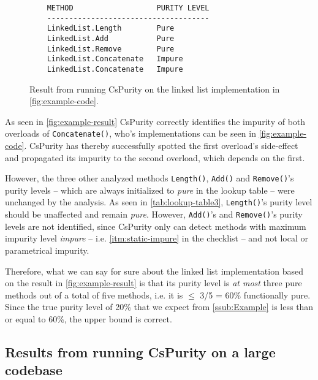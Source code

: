 \documentclass[a4paper,12pt]{article}
\begin{document}
\begin{figure}[htpb]
  \centering
  \begin{minipage}{\linewidth} %
    \begin{lstlisting}
    METHOD                   PURITY LEVEL
    -------------------------------------
    LinkedList.Length        Pure
    LinkedList.Add           Pure
    LinkedList.Remove        Pure
    LinkedList.Concatenate   Impure
    LinkedList.Concatenate   Impure
    \end{lstlisting}
  \end{minipage}
  \caption{Result from running CsPurity on the linked list implementation in \autoref{fig:example-code}.}
  \label{fig:example-result}
\end{figure}

As seen in \autoref{fig:example-result} CsPurity correctly identifies the impurity of both overloads of \texttt{Concatenate()}, who's implementations can be seen in \autoref{fig:example-code}. CsPurity has thereby successfully spotted the first overload's side-effect and propagated its impurity to the second overload, which depends on the first.

However, the three other analyzed methods \texttt{Length()}, \texttt{Add()} and \texttt{Remove()}'s purity levels -- which are always initialized to \textit{pure} in the lookup table -- were unchanged by the analysis. As seen in \autoref{tab:lookup-table3}, \texttt{Length()}'s purity level should be unaffected and remain \textit{pure}. However, \texttt{Add()}'s and \texttt{Remove()}'s purity levels are not identified, since CsPurity only can detect methods with maximum impurity level \textit{impure} -- i.e. \autoref{itm:static-impure} in the checklist -- and not local or parametrical impurity.

Therefore, what we can say for sure about the linked list implementation based on the result in \autoref{fig:example-result} is that its purity level is \textit{at most} three pure methods out of a total of five methods, i.e. it is $\leq$ 3/5 = 60\% functionally pure. Since the true purity level of 20\% that we expect from \autoref{ssub:Example} is less than or equal to 60\%, the upper bound is correct.


\subsection{Results from running CsPurity on a large codebase} \label{sub:results-larger-codebase}
\end{document}
